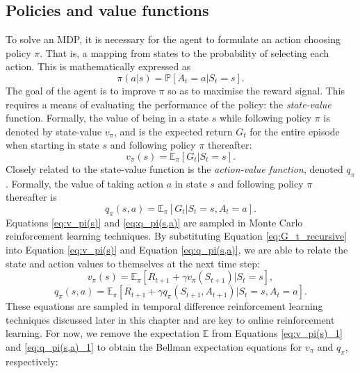 \subsection{Policies and value functions}
To solve an MDP, it is necessary for the agent to formulate an action choosing policy $\pi$. That is, a mapping from states to the probability of selecting each action. This is mathematically expressed as
\begin{equation}
\pi(a|s) = \mathbb{P} [A_t=a | S_t=s].
\label{eq:pi(a|s)}
\end{equation}
The goal of the agent is to improve $\pi$ so as to maximise the reward signal. 
This requires a means of evaluating the performance of the policy: the \emph{state-value} function.
Formally, the value of being in a state $s$ while following policy $\pi$ is denoted by state-value $v_\pi$, and is the expected return $G_t$ for the entire episode when starting in state $s$ and following policy $\pi$ thereafter:
\begin{equation}
v_\pi(s) = \mathbb{E}_{\pi} [G_t | S_t=s].
\label{eq:v_pi(s)}
\end{equation}
Closely related to the state-value function is the \emph{action-value function}, denoted $q_\pi$. Formally, the value of taking action $a$ in state $s$ and following policy $\pi$ thereafter is
\begin{equation}
q_\pi(s,a) = \mathbb{E}_{\pi} [G_t | S_t=s, A_t=a].
\label{eq:q_pi(s,a)}
\end{equation}
Equations \ref{eq:v_pi(s)} and \ref{eq:q_pi(s,a)} are sampled in Monte Carlo reinforcement learning techniques.
By substituting Equation \ref{eq:G_t_recursive} into Equation \ref{eq:v_pi(s)} and Equation \ref{eq:q_pi(s,a)}, we are able to relate the state and action values to themselves at the next time step:
\begin{equation}
v_\pi(s) = \mathbb{E}_{\pi} [R_{t+1} + \gamma v_{\pi}(S_{t+1}) | S_t = s],
\label{eq:v_pi(s)_1}
\end{equation}
\begin{equation}
q_\pi(s,a) = \mathbb{E}_{\pi} [R_{t+1} + \gamma q_{\pi}(S_{t+1}, A_{t+1}) | S_t = s, A_t=a].
\label{eq:q_pi(s,a)_1}
\end{equation}
These equations are sampled in temporal difference reinforcement learning techniques discussed later in this chapter and are key to online reinforcement learning. 
For now, we remove the expectation $\mathbb{E}$ from Equations \ref{eq:v_pi(s)_1} and \ref{eq:q_pi(s,a)_1} to obtain the Bellman expectation equations for $v_\pi$ and $q_\pi$, respectively:
